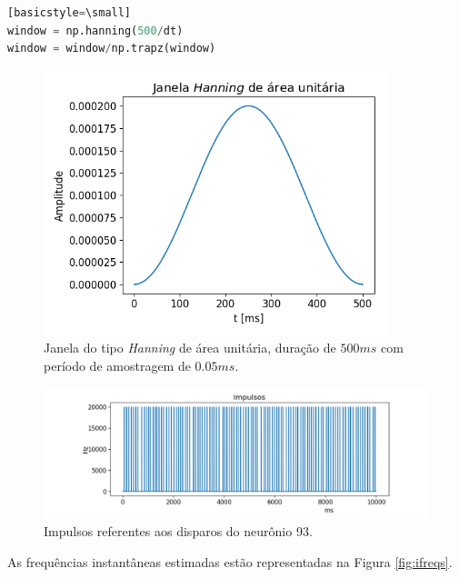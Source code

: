 \documentclass[12pt,letterpaper]{article}
\begin{document}
\begin{enumerate}[label=(\alph*)]
       \begin{lstlisting}[language=Python][basicstyle=\small]
window = np.hanning(500/dt)
window = window/np.trapz(window)
    \end{lstlisting}
        
        \begin{figure}[H]
            \centering
            \includegraphics[width=10cm]{TC2/images/hann.png}
            \caption{Janela do tipo {\it Hanning} de área unitária, duração de ${500 ms}$ com período de amostragem de ${0.05 ms}$.}
            \label{fig:hann}
        \end{figure}
    
        \begin{figure}[H]
            \centering
            \includegraphics[width=15cm]{TC2/images/impulsos.png}
            \caption{Impulsos referentes aos disparos do neurônio 93.}
            \label{fig:impulsos}
        \end{figure}
    
    As frequências instantâneas estimadas estão representadas na Figura \ref{fig:ifreqs}.
    

\end{enumerate}
\end{document}
